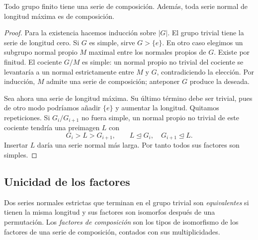 \begin{prop}\label{prop:C8-existencia}
Todo grupo finito tiene una serie de composición. Además, toda serie normal de longitud máxima es de composición.
\end{prop}
\begin{proof}
Para la existencia hacemos inducción sobre $|G|$. El grupo trivial tiene la serie de longitud cero. Si $G$ es simple, sirve $G>\{e\}$. En otro caso elegimos un subgrupo normal propio $M$ maximal entre los normales propios de $G$. Existe por finitud. El cociente $G/M$ es simple: un normal propio no trivial del cociente se levantaría a un normal estrictamente entre $M$ y $G$, contradiciendo la elección. Por inducción, $M$ admite una serie de composición; anteponer $G$ produce la deseada.

Sea ahora una serie de longitud máxima. Su último término debe ser trivial, pues de otro modo podríamos añadir $\{e\}$ y aumentar la longitud. Quitamos repeticiones. Si $G_i/G_{i+1}$ no fuera simple, un normal propio no trivial de este cociente tendría una preimagen $L$ con
\[
G_i>L>G_{i+1},\qquad L\trianglelefteq G_i,
\quad G_{i+1}\trianglelefteq L.
\]
Insertar $L$ daría una serie normal más larga. Por tanto todos sus factores son simples.
\end{proof}

\subsection{Unicidad de los factores}
\begin{defi}
Dos series normales estrictas que terminan en el grupo trivial son \emph{equivalentes} si tienen la misma longitud y sus factores son isomorfos después de una permutación. Los \emph{factores de composición} son los tipos de isomorfismo de los factores de una serie de composición, contados con sus multiplicidades.
\end{defi}

